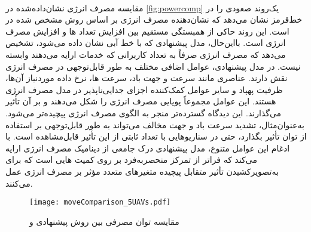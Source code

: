 \\
مقایسه مصرف انرژی نشان‌داده‌شده در \autoref{fig:powercomp} یک‌روند صعودی را در خط‌قرمز نشان می‌دهد که نشان‌دهنده مصرف انرژی بر اساس روش مشخص شده در \cite{8892933} است. این روند حاکی از همبستگی مستقیم بین افزایش تعداد ها و افزایش مصرف انرژی است. بااین‌حال، مدل پیشنهادی که با خط آبی نشان داده می‌شود، تشخیص می‌دهد که مصرف انرژی صرفاً به تعداد کاربرانی که خدمات ارایه می‌دهند وابسته نیست. در مدل پیشنهادی، عوامل اضافی مختلف به طور قابل‌توجهی در مصرف انرژی نقش دارند. عناصری مانند سرعت و جهت باد، سرعت ها، نرخ داده موردنیاز آن‌ها، ظرفیت پهپاد و سایر عوامل کمک‌کننده اجزای جدایی‌ناپذیر در مدل مصرف انرژی هستند. این عوامل مجموعاً پویایی مصرف انرژی را شکل می‌دهند و بر آن تأثیر می‌گذارند. این دیدگاه گسترده‌تر منجر به الگوی مصرف انرژی پیچیده‌تر می‌شود. به‌عنوان‌مثال، تشدید سرعت باد و جهت مخالف می‌تواند به طور قابل‌توجهی بر استفاده از توان تأثیر بگذارد، حتی در سناریوهایی با تعداد ثابتی از  این تأثیر قابل‌مشاهده است. با ادغام این عوامل متنوع، مدل پیشنهادی درک جامعی از دینامیک مصرف انرژی ارایه می‌کند که فراتر از تمرکز منحصربه‌فرد بر روی کمیت هایی است که برای به‌تصویرکشیدن تأثیر متقابل پیچیده متغیرهای متعدد مؤثر بر مصرف انرژی عمل می‌کنند.
\begin{figure}
\texttt{[image: moveComparison\_5UAVs.pdf]}
\caption[%
مقایسه توان مصرفی با روش‌ دیگر]{مقایسه توان مصرفی بین روش پیشنهادی و \cite{8892933}}
	\label{fig:powercomp}
\end{figure}